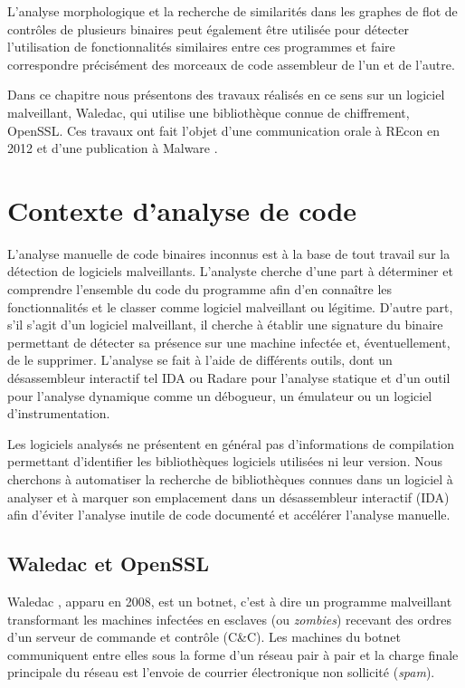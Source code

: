 L'analyse morphologique et la recherche de similarités dans les graphes de flot de contrôles de plusieurs binaires peut également être utilisée pour détecter l'utilisation de fonctionnalités similaires entre ces programmes et faire correspondre précisément des morceaux de code assembleur de l'un et de l'autre.

Dans ce chapitre nous présentons des travaux réalisés en ce sens sur un logiciel malveillant, Waledac, qui utilise une bibliothèque connue de chiffrement, OpenSSL.
Ces travaux ont fait l'objet d'une communication orale à REcon en 2012 \cite{REAT12} et d'une publication à Malware \cite{mal12}.

\section{Contexte d'analyse de code}
L'analyse manuelle de code binaires inconnus est à la base de tout travail sur la détection de logiciels malveillants.
L'analyste cherche d'une part à déterminer et comprendre l'ensemble du code du programme afin d'en connaître les fonctionnalités
et le classer comme logiciel malveillant ou légitime.
D'autre part, s'il s'agit d'un logiciel malveillant, il cherche à établir une signature du binaire permettant de détecter sa présence sur une machine infectée et, éventuellement, de le supprimer.
L'analyse se fait à l'aide de différents outils, dont un désassembleur interactif tel IDA \cite{IDA} ou Radare \cite{radare} pour l'analyse statique et d'un outil pour l'analyse dynamique comme un débogueur, un émulateur ou un logiciel d'instrumentation.

Les logiciels analysés ne présentent en général pas d'informations de compilation permettant d'identifier les bibliothèques logiciels utilisées ni leur version. Nous cherchons à automatiser la recherche de bibliothèques connues dans un logiciel à analyser et à marquer son emplacement dans un désassembleur interactif (IDA) afin d'éviter l'analyse inutile de code documenté et accélérer l'analyse manuelle.

\subsection{Waledac et OpenSSL}
Waledac \cite{CRFLSGBA10}, apparu en 2008, est un botnet, c'est à dire un programme malveillant transformant les machines infectées en esclaves (ou \emph{zombies}) recevant des ordres d'un serveur de commande et contrôle (C\&C).
Les machines du botnet communiquent entre elles sous la forme d'un réseau pair à pair et la charge finale principale du réseau est l'envoie de courrier électronique non sollicité (\emph{spam}).

